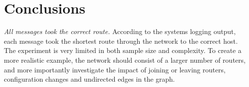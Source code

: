 \documentclass[a4paper, 11pt]{article}
\begin{document}
\section{Conclusions}

\textit{All messages took the correct route.}
According to the systems logging output, each message took the shortest route through the network to the correct host.
The experiment is very limited in both sample size and complexity. To create a more realistic example, the network
should consist of a larger number of routers, and more importantly investigate the impact of joining or leaving routers,
configuration changes and undirected edges in the graph.
\end{document}
